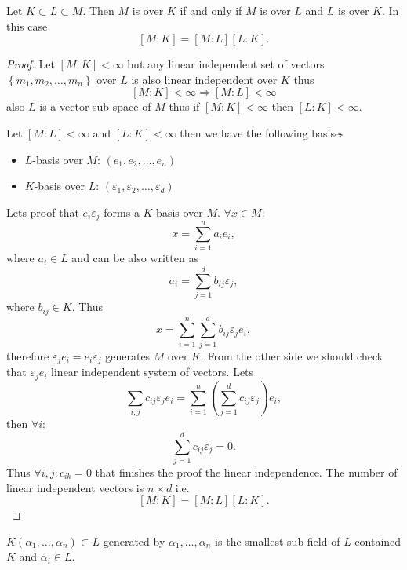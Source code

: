 \begin{theorem}
  Let $K \subset L \subset M$. Then $M$ is
   over $K$ if and only if
  $M$ is  over $L$ and
  $L$ is  over $K$. In this case
  \[
  \left[M:K\right] = \left[M:L\right] \left[L:K\right].
  \]
  \begin{proof}
    Let $\left[M:K\right] < \infty$ but any linear independent set of
    vectors  $\left\{m_1, m_2, \dots, m_n\right\}$ over $L$ is also
    linear independent over $K$ thus
    \[
    \left[M:K\right] < \infty \Rightarrow \left[M:L\right] < \infty
    \]
    also $L$ is a vector sub space of $M$ thus if
    $\left[M:K\right] < \infty$ then $\left[L:K\right] < \infty$.

    Let $\left[M:L\right] < \infty$ and $\left[L:K\right] < \infty$
    then we have the following basises
    \begin{itemize}
    \item $L$-basis over $M$: $\left(e_1, e_2, \dots, e_n\right)$
    \item $K$-basis over $L$:
      $\left(\varepsilon_1, \varepsilon_2, \dots, \varepsilon_d\right)$
    \end{itemize}
    Lets proof that $e_i\varepsilon_j$ forms a $K$-basis over $M$.
    $\forall x \in M$:
    \[
    x = \sum_{i=1}^n a_i e_i, 
    \]
    where $a_i \in L$ and can be also written as
    \[
    a_i = \sum_{j=1}^d b_{ij} \varepsilon_j,
    \]
    where $b_{ij} \in K$.
    Thus
    \[
    x = \sum_{i=1}^n \sum_{j=1}^d b_{ij} \varepsilon_j e_i, 
    \]
    therefore $\varepsilon_j e_i = e_i \varepsilon_j$ generates $M$
    over $K$. From the other side we should check that $\varepsilon_j
    e_i$ linear independent system of vectors. Lets
    \[
    \sum_{i,j} c_{ij} \varepsilon_j e_i =
    \sum_{i=1}^n \left( \sum_{j=1}^d c_{ij} \varepsilon_j \right) e_i,
    \]
    then $\forall i$:
    \[
    \sum_{j=1}^d c_{ij} \varepsilon_j = 0.
    \]
    Thus $\forall i,j: c_{ik} = 0$ that finishes the proof the linear
    independence.   
    The number of linear independent vectors is $n \times d$ i.e.
    \[
    \left[M:K\right] = \left[M:L\right] \left[L:K\right].
    \]
  \end{proof}
  \label{thm:mulformuladegrees}
\end{theorem}

\begin{definition}
  $K\left(\alpha_1, \dots, \alpha_n\right) \subset L$ generated by
  $\alpha_1, \dots, \alpha_n$ is the smallest sub field of $L$
  contained  $K$ and $\alpha_i \in L$.
\end{definition}

